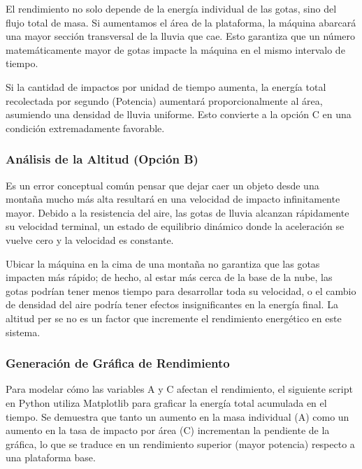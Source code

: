 \documentclass[12pt, a4paper]{article}
\begin{document}
El rendimiento no solo depende de la energía individual de las gotas, sino del flujo total de masa. Si aumentamos el área de la plataforma, la máquina abarcará una mayor sección transversal de la lluvia que cae. Esto garantiza que un número matemáticamente mayor de gotas impacte la máquina en el mismo intervalo de tiempo. 

Si la cantidad de impactos por unidad de tiempo aumenta, la energía total recolectada por segundo (Potencia) aumentará proporcionalmente al área, asumiendo una densidad de lluvia uniforme. Esto convierte a la opción C en una condición extremadamente favorable.

\subsubsection*{Análisis de la Altitud (Opción B)}

Es un error conceptual común pensar que dejar caer un objeto desde una montaña mucho más alta resultará en una velocidad de impacto infinitamente mayor. Debido a la resistencia del aire, las gotas de lluvia alcanzan rápidamente su velocidad terminal, un estado de equilibrio dinámico donde la aceleración se vuelve cero y la velocidad es constante. 

Ubicar la máquina en la cima de una montaña no garantiza que las gotas impacten más rápido; de hecho, al estar más cerca de la base de la nube, las gotas podrían tener menos tiempo para desarrollar toda su velocidad, o el cambio de densidad del aire podría tener efectos insignificantes en la energía final. La altitud per se no es un factor que incremente el rendimiento energético en este sistema.

\subsubsection*{Generación de Gráfica de Rendimiento}

Para modelar cómo las variables A y C afectan el rendimiento, el siguiente script en Python utiliza Matplotlib para graficar la energía total acumulada en el tiempo. Se demuestra que tanto un aumento en la masa individual (A) como un aumento en la tasa de impacto por área (C) incrementan la pendiente de la gráfica, lo que se traduce en un rendimiento superior (mayor potencia) respecto a una plataforma base.
\end{document}
